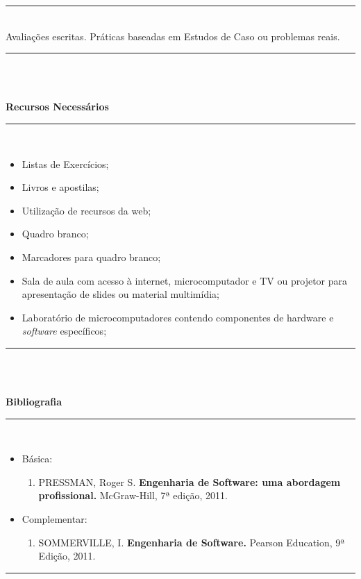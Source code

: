 \noindent\rule{16.5cm}{0.4pt}
\\
   Avaliações escritas. Práticas baseadas em Estudos de Caso ou problemas reais.\\
\noindent\rule{16.5cm}{0.4pt}\\
\\
\vspace{-12mm}
\begin{center}\textbf{Recursos Necessários}\end{center}
\vspace{-5mm}
\noindent\rule{16.5cm}{0.4pt}
\\
\begin{itemize} 
  \item Listas de Exercícios;
  \item Livros e apostilas;
  \item Utilização de recursos da web;
  \item Quadro branco;
  \item Marcadores para quadro branco;
  \item Sala de aula com acesso à internet, microcomputador e TV ou projetor para apresentação de slides ou material multimídia;
  \item Laboratório de microcomputadores contendo componentes de hardware e \textit{software} específicos;
\end{itemize}
\noindent\rule{16.5cm}{0.4pt}\\
\\
\vspace{-12mm}
\begin{center}\textbf{Bibliografia}\end{center}
\vspace{-5mm}
\noindent\rule{16.5cm}{0.4pt}
\\
\begin{itemize} 
  \item Básica:
	\begin{enumerate}
  	\item PRESSMAN, Roger S. \textbf{Engenharia de Software: uma abordagem profissional.} McGraw-Hill,  7ª edição, 2011.    
	\end{enumerate}
    
  \item Complementar:
	\begin{enumerate}
  	\item  SOMMERVILLE, I. \textbf{Engenharia de Software.} Pearson
Education, 9ª Edição, 2011.
	\end{enumerate}
\end{itemize}
\noindent\rule{16.5cm}{0.4pt}\\
\\